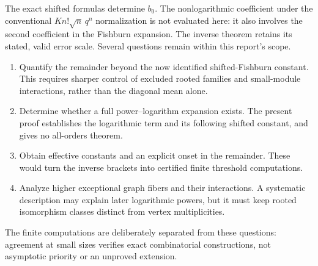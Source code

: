 \documentclass[11pt,letterpaper]{article}
\theoremstyle{definition}\newtheorem{definition}[theorem]{Definition}
\theoremstyle{remark}\newtheorem{remark}[theorem]{Remark}
\begin{document}
The exact shifted formulas determine $b_0$. The nonlogarithmic coefficient under the conventional $K n!\sqrt n\,q^n$ normalization is not evaluated here: it also involves the second coefficient in the Fishburn expansion. The inverse theorem retains its stated, valid error scale. Several questions remain within this report's scope.
\begin{enumerate}
\item Quantify the remainder beyond the now identified shifted-Fishburn constant. This requires sharper control of excluded rooted families and small-module interactions, rather than the diagonal mean alone.
\item Determine whether a full power--logarithm expansion exists. The present proof establishes the logarithmic term and its following shifted constant, and gives no all-orders theorem.
\item Obtain effective constants and an explicit onset in the remainder. These would turn the inverse brackets into certified finite threshold computations.
\item Analyze higher exceptional graph fibers and their interactions. A systematic description may explain later logarithmic powers, but it must keep rooted isomorphism classes distinct from vertex multiplicities.
\end{enumerate}
The finite computations are deliberately separated from these questions: agreement at small sizes verifies exact combinatorial constructions, not asymptotic priority or an unproved extension.
\end{document}
